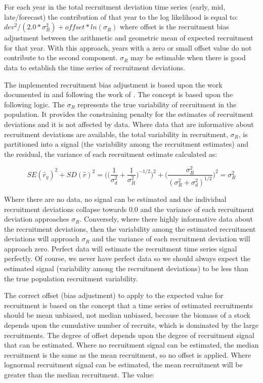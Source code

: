 \hypertarget{RecBias}{}
For each year in the total recruitment deviation time series (early, mid, late/forecast) the contribution of that year to the log likelihood is equal to:  $dev^2/(2.0*\sigma^2_R)+offset*ln(\sigma_R)$ where offset is the recruitment bias adjustment between the arithmetic and geometric mean of expected recruitment for that year.  With this approach, years with a zero or small offset value do not contribute to the second component. $\sigma_R$ may be estimable when there is good data to establish the time series of recruitment deviations.

The implemented recruitment bias adjustment is based upon the work documented in \citet{methot-adjusting-2011} and following the work of \citet{maunder-estimation-2003}.  The concept is based upon the following logic.  The $\sigma_R$ represents the true variability of recruitment in the population.  It provides the constraining penalty for the estimates of recruitment deviations and it is not affected by data.  Where data that are informative about recruitment deviations are available, the total variability in recruitment, $\sigma_R$, is partitioned into a signal (the variability among the recruitment estimates) and the residual, the variance of each recruitment estimate calculated as:  

\begin{equation}
SE(\hat{r}_y)^2 + SD(\hat{r})^2=\Bigg( \bigg( \frac{1}{\sigma^2_d}+\frac{1}{\sigma^2_R}\bigg)^{-1/2}\Bigg)^2+\Bigg( \frac{\sigma^2_R}{(\sigma^2_R+\sigma^2_d)^{1/2}}\Bigg)^2=\sigma^2_R
\end{equation}

Where there are no data, no signal can be estimated and the individual recruitment deviations collapse towards 0.0 and the variance of each recruitment deviation approaches $\sigma_R$.  Conversely, where there highly informative data about the recruitment deviations, then the variability among the estimated recruitment deviations will approach $\sigma_R$ and the variance of each recruitment deviation will approach zero.  Perfect data will estimate the recruitment time series signal perfectly.  Of course, we never have perfect data so we should always expect the estimated signal (variability among the recruitment deviations) to be less than the true population recruitment variability.


The correct offset (bias adjustment) to apply to the expected value for recruitment is based on the concept that a time series of estimated recruitments should be mean unbiased, not median unbiased, because the biomass of a stock depends upon the cumulative number of recruits, which is dominated by the large recruitments.  The degree of offset depends upon the degree of recruitment signal that can be estimated.  Where no recruitment signal can be estimated, the median recruitment is the same as the mean recruitment, so no offset is applied.  Where lognormal recruitment signal can be estimated, the mean recruitment will be greater than the median recruitment.  The value:

